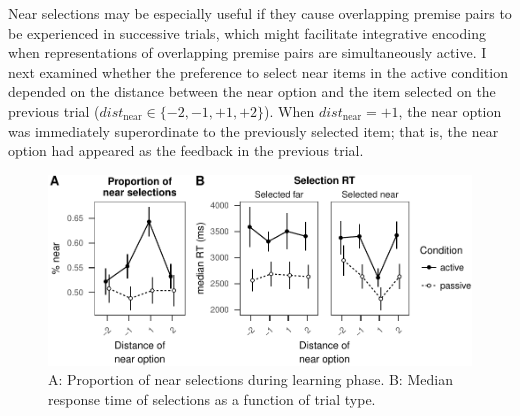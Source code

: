 \documentclass[floatsintext,man]{apa6}
\theoremstyle{definition}
\theoremstyle{definition}
\theoremstyle{definition}
\theoremstyle{remark}
\begin{document}
Near selections may be especially useful if they cause overlapping
premise pairs to be experienced in successive trials, which might
facilitate integrative encoding when representations of overlapping
premise pairs are simultaneously active. I next examined whether the
preference to select near items in the active condition depended on the
distance between the near option and the item selected on the previous
trial (\(dist_{\text{near}} \in \{-2, -1, +1, +2\}\)). When
\(dist_{\text{near}}=+1\), the near option was immediately superordinate
to the previously selected item; that is, the near option had appeared
as the feedback in the previous trial.

\begin{figure}
\centering
\includegraphics{active_transitive_inference_files/figure-latex/unnamed-chunk-5-1.pdf}
\caption{\label{fig:unnamed-chunk-5}A: Proportion of near selections during
learning phase. B: Median response time of selections as a function of
trial type. \label{fig_prop_near}}
\end{figure}
\end{document}
